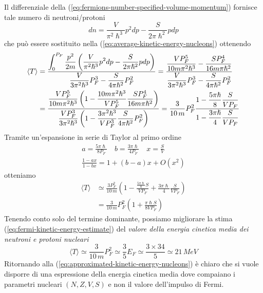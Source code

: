 Il differenziale della (\ref{eq:fermions-number-specified-volume-momentum}) fornisce tale numero di neutroni/protoni
\[
dn = \frac{V}{\pi^{2}\hslash^{3}} p^{2}dp - \frac{S}{2 \pi \hslash^{2}} pdp
\]
che può essere sostituito nella (\ref{eq:average-kinetic-energy-nucleons}) ottenendo
\begin{align*}
    \langle T \rangle &= \fraclarg{\int_{0}^{P_{F}} \frac{p^{2}}{ 2m}\left(\frac{V}{\pi^{2}\hslash^{3}} p^{2}dp - \frac{S}{2 \pi \hslash^{2}} pdp \right)  }{\frac{V}{3\pi^{2}\hslash^{3}} P_{F}^{3} - \frac{S}{4 \pi \hslash^{2}} P_{F}^{2} }
    = \fraclarg{\frac{VP_{F}^{5}}{10m\pi^{2}\hslash^{3}} - \frac{SP_{F}^{4}}{16m\pi \hslash^{2}}}{\frac{V}{3\pi^{2}\hslash^{3}} P_{F}^{3} - \frac{S}{4 \pi \hslash^{2}} P_{F}^{2}}\\
    &= \fraclarg{\frac{VP_{F}^{5}}{10m \pi^{2}\hslash^{3}}\left( 1 - \frac{10m\pi^{2}\hslash^{3}}{VP_{F}^{5}} \frac{SP_F^{4}}{16 m \pi \hslash^{2}} \right)}{\frac{VP_{F}^{3}}{3\pi^{2}\hslash^{3}}\left( 1 - \frac{3\pi^{2}\hslash^{3}}{VP_{F}^{3}} \frac{S}{4 \pi \hslash^{2}}P_{F}^{2} \right)}
	= \frac{3}{10 \,m}P_{F}^{2} \fraclarg{1 - \frac{5\pi \hslash}{8} \frac{S}{VP_{F}}}{1 - \frac{3\pi \hslash}{4} \frac{S}{VP_{F}}}
\end{align*}
Tramite un'espansione in serie di Taylor al primo ordine
\begin{gather*}
    a = \frac{5\pi \hslash}{8 P_{F}} \quad b = \frac{3\pi \hslash}{4 P_{F}} \quad x = \frac{S}{V}\\
    \frac{1-ax}{1-bx} = 1 + (b-a)x + O(x^{2})
\end{gather*}
otteniamo
\begin{align}
    \langle T \rangle &\simeq  \frac{3P_{F}^{2}}{10 \, m} \left( 1 - \frac{\frac{5\pi \hslash}{8}S}{VP_{F}}+ \frac{3\pi \hslash}{4} \frac{S}{V P_{F}} \right) \nonumber\\
     &= \frac{3}{10 \, m}P_{F}^{2} \left( 1 + \frac{\pi\hslash S}{8 V P_{F}} \right)
	\label{eq:approximated-kinetic-energy-nucleons}
\end{align}
Tenendo conto solo del termine dominante, possiamo migliorare la stima (\ref{eq:fermi-kinetic-energy-estimate}) del \emph{valore della energia cinetica media dei neutroni e protoni nucleari}
\[
\langle T \rangle \simeq \frac{3}{10 \, m} P_{F}^{2} \simeq \frac{3}{5}E_{F} \simeq \frac{3 \times 34}{5} \simeq 21 \, MeV
\]
Ritornando alla (\ref{eq:approximated-kinetic-energy-nucleons}) è chiaro che si vuole disporre di una espressione della energia cinetica media dove compaiano i parametri nucleari $(N, Z, V, S)$ e non il valore dell’impulso di Fermi.
